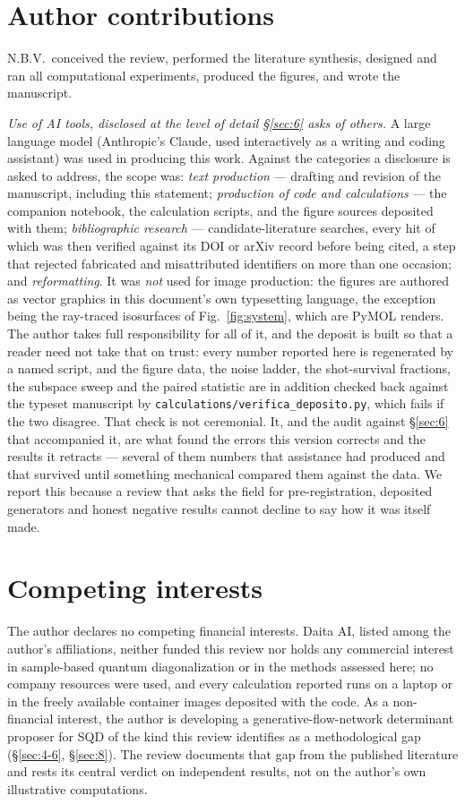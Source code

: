 \documentclass[onecolumn,a4paper]{quantumarticle}
\begin{document}
\section*{Author contributions}
\small
N.B.V.\ conceived the review, performed the literature synthesis, designed and ran all computational
experiments, produced the figures, and wrote the manuscript.

\emph{Use of AI tools, disclosed at the level of detail \S\ref{sec:6} asks of others.} A large language model (Anthropic's Claude, used interactively as a writing and coding assistant) was used in producing this work. Against the categories a disclosure is asked to address, the scope was: \emph{text production} --- drafting and revision of the manuscript, including this statement; \emph{production of code and calculations} --- the companion notebook, the calculation scripts, and the figure sources deposited with them; \emph{bibliographic research} --- candidate-literature searches, every hit of which was then verified against its DOI or arXiv record before being cited, a step that rejected fabricated and misattributed identifiers on more than one occasion; and \emph{reformatting}. It was \emph{not} used for image production: the figures are authored as vector graphics in this document's own typesetting language, the exception being the ray-traced isosurfaces of Fig.~\ref{fig:system}, which are PyMOL renders. The author takes full responsibility for all of it, and the deposit is built so that a reader need not take that on trust: every number reported here is regenerated by a named script, and the figure data, the noise ladder, the shot-survival fractions, the subspace sweep and the paired statistic are in addition checked back against the typeset manuscript by \texttt{calculations/verifica\_deposito.py}, which fails if the two disagree. That check is not ceremonial. It, and the audit against \S\ref{sec:6} that accompanied it, are what found the errors this version corrects and the results it retracts --- several of them numbers that assistance had produced and that survived until something mechanical compared them against the data. We report this because a review that asks the field for pre-registration, deposited generators and honest negative results cannot decline to say how it was itself made.

\section*{Competing interests}
\small
The author declares no competing financial interests. Daita AI, listed among the author's affiliations, neither funded this review nor holds any commercial interest in sample-based quantum diagonalization or in the methods assessed here; no company resources were used, and every calculation reported runs on a laptop or in the freely available container images deposited with the code. As a non-financial interest, the author is developing a generative-flow-network determinant proposer for SQD of the kind this review identifies as a methodological gap (\S\ref{sec:4-6}, \S\ref{sec:8}). The review documents that gap from the published literature and rests its central verdict on independent results, not on the author's own illustrative computations.
\end{document}
